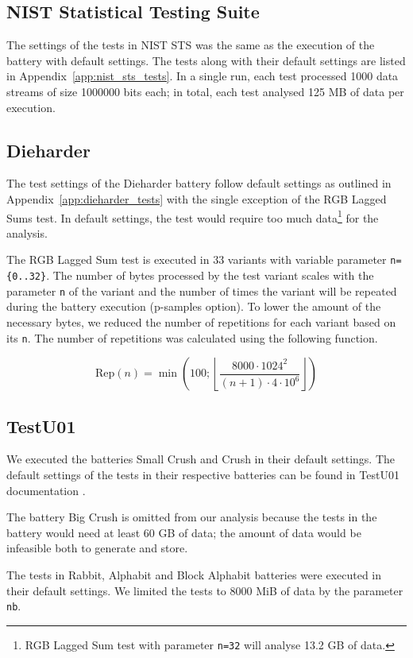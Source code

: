 \documentclass[
	digital,    %
	oneside,    %
	color,
	11pt,
	nocover,
	notable,
	nolof,
	nolot,
]{fithesis3}
\theoremstyle{definition}
\theoremstyle{remark}
\begin{document}
\subsection*{NIST Statistical Testing Suite}
The settings of the tests in NIST STS was the same as the execution of the battery with default settings. The tests along with their default settings are listed in Appendix~\ref{app:nist_sts_tests}. In a single run, each test processed 1000 data streams of size 1000000 bits each; in total, each test analysed 125 MB of data per execution.

\subsection*{Dieharder}
The test settings of the Dieharder battery follow default settings as outlined in Appendix~\ref{app:dieharder_tests} with the single exception of the RGB Lagged Sums test. In default settings, the test would require too much data\footnote{RGB Lagged Sum test with parameter \texttt{n=32} will analyse 13.2 GB of data.} for the analysis. 

The RGB Lagged Sum test is executed in 33 variants with variable parameter \texttt{n=\{0..32\}}. The number of bytes processed by the test variant scales with the parameter \texttt{n} of the variant and the number of times the variant will be repeated during the battery execution (p-samples option). To lower the amount of the necessary bytes, we reduced the number of repetitions for each variant based on its \texttt{n}. The number of repetitions was calculated using the following function.

$$
\text{Rep}(n) = \min\left(100 ; \left\lfloor \frac{ 8000 \cdot 1024^{2} }{ (n + 1) \cdot 4 \cdot 10^{6} } \right\rfloor \right)
$$

\subsection*{TestU01}
We executed the batteries Small Crush and Crush in their default settings. The default settings of the tests in their respective batteries can be found in TestU01 documentation \cite[p.~143]{testu01-documentation}.

The battery Big Crush is omitted from our analysis because the tests in the battery would need at least 60 GB of data; the amount of data would be infeasible both to generate and store.

The tests in Rabbit, Alphabit and Block Alphabit batteries were executed in their default settings. We limited the tests to 8000 MiB of data by the parameter \texttt{nb}.
\end{document}
